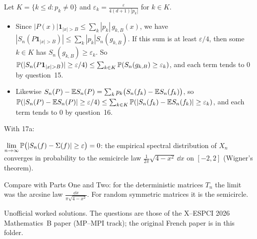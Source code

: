 \documentclass[11pt,a4paper]{article}
\begin{document}
Let $K = \{k\le d : p_k\ne0\}$ and $\varepsilon_k = \frac{\varepsilon}{4(d+1)|p_k|}$ for
$k\in K$.
\begin{itemize}
\item Since $|P(x)|\mathbf1_{|x|>B}\le\sum_k|p_k|\,g_{k,B}(x)$, we have
  $|S_n(P\mathbf1_{|x|>B})|\le\sum_k|p_k|S_n(g_{k,B})$. If this sum is at least
  $\varepsilon/4$, then some $k\in K$ has $S_n(g_{k,B})\ge\varepsilon_k$. So
  $\PP(|S_n(P\mathbf1_{|x|>B})|\ge\varepsilon/4)\le\sum_{k\in K}\PP(S_n(g_{k,B})\ge\varepsilon_k)$,
  and each term tends to $0$ by question~15.
\item Likewise
  $S_n(P)-\mathbb{E} S_n(P) = \sum_kp_k\bigl(S_n(f_k)-\mathbb{E} S_n(f_k)\bigr)$, so
  $\mathbb{P}(|S_n(P)-\mathbb{E} S_n(P)|\ge\varepsilon/4)\le\sum_{k\in K}\mathbb{P}(|S_n(f_k)-\mathbb{E} S_n(f_k)|\ge\varepsilon_k)$,
  and each term tends to $0$ by question~16.
\end{itemize}
With 17a:
\begin{result}
$\displaystyle\lim_{n\to\infty}\mathbb{P}\bigl(|S_n(f)-\Sigma(f)|\ge\varepsilon\bigr) = 0$: the
empirical spectral distribution of $X_n$ converges in probability to the semicircle law
$\frac1{2\pi}\sqrt{4-x^2}\,\dd x$ on $[-2,2]$ (Wigner's theorem).
\end{result}
Compare with Parts One and Two: for the deterministic matrices $T_n$ the limit was the
arcsine law $\frac{\dd x}{\pi\sqrt{4-x^2}}$. For random symmetric matrices it is the
semicircle.

\par\vspace{8mm}
\begin{center}\small\color{black!55}
Unofficial worked solutions. The questions are those of the X--ESPCI 2026 Mathematics~B paper
(MP--MPI track); the original French paper is in this folder.
\end{center}
\end{document}
